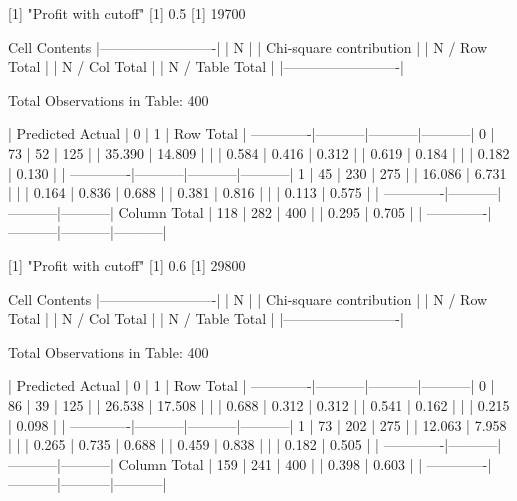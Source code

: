 \documentclass{article}
\begin{document}
\begin{Schunk}
\begin{Soutput}
 
[1] "Profit with cutoff"
[1] 0.5
[1] 19700

 
   Cell Contents
|-------------------------|
|                       N |
| Chi-square contribution |
|           N / Row Total |
|           N / Col Total |
|         N / Table Total |
|-------------------------|

 
Total Observations in Table:  400 

 
             | Predicted 
      Actual |         0 |         1 | Row Total | 
-------------|-----------|-----------|-----------|
           0 |        73 |        52 |       125 | 
             |    35.390 |    14.809 |           | 
             |     0.584 |     0.416 |     0.312 | 
             |     0.619 |     0.184 |           | 
             |     0.182 |     0.130 |           | 
-------------|-----------|-----------|-----------|
           1 |        45 |       230 |       275 | 
             |    16.086 |     6.731 |           | 
             |     0.164 |     0.836 |     0.688 | 
             |     0.381 |     0.816 |           | 
             |     0.113 |     0.575 |           | 
-------------|-----------|-----------|-----------|
Column Total |       118 |       282 |       400 | 
             |     0.295 |     0.705 |           | 
-------------|-----------|-----------|-----------|

 
[1] "Profit with cutoff"
[1] 0.6
[1] 29800

 
   Cell Contents
|-------------------------|
|                       N |
| Chi-square contribution |
|           N / Row Total |
|           N / Col Total |
|         N / Table Total |
|-------------------------|

 
Total Observations in Table:  400 

 
             | Predicted 
      Actual |         0 |         1 | Row Total | 
-------------|-----------|-----------|-----------|
           0 |        86 |        39 |       125 | 
             |    26.538 |    17.508 |           | 
             |     0.688 |     0.312 |     0.312 | 
             |     0.541 |     0.162 |           | 
             |     0.215 |     0.098 |           | 
-------------|-----------|-----------|-----------|
           1 |        73 |       202 |       275 | 
             |    12.063 |     7.958 |           | 
             |     0.265 |     0.735 |     0.688 | 
             |     0.459 |     0.838 |           | 
             |     0.182 |     0.505 |           | 
-------------|-----------|-----------|-----------|
Column Total |       159 |       241 |       400 | 
             |     0.398 |     0.603 |           | 
-------------|-----------|-----------|-----------|


\end{Soutput}
\end{Schunk}
\end{document}
